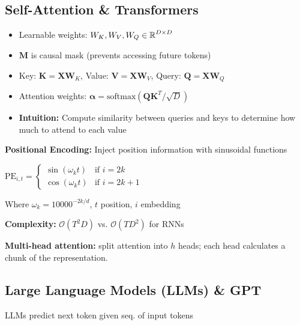 
\subsection{Self-Attention \& Transformers}


\begin{itemize}
    \item Learnable weights: $W_K, W_V, W_Q \in \operatorname{\mathbb{R}}^{D \times D}$
    \item $\mathbf{M}$ is causal mask (prevents accessing future tokens)
    \item \small Key: $\mathbf{K} = \mathbf{X}\mathbf{W}_K$, Value: $\mathbf{V} = \mathbf{X}\mathbf{W}_V$, Query: $\mathbf{Q} = \mathbf{X}\mathbf{W}_Q$
    \item Attention weights: $\boldsymbol{\alpha} = \text{softmax}(\mathbf{Q}\mathbf{K}^T / \sqrt{D})$
    \item \textbf{Intuition:} Compute similarity between queries and keys to determine how much to attend to each value
\end{itemize}

\textbf{Positional Encoding:} Inject position information with sinusoidal functions

$\text{PE}_{i,t} = \begin{cases}
\sin(\omega_k t) & \text{if } i = 2k \\
\cos(\omega_k t) & \text{if } i = 2k+1
\end{cases}$

Where $\omega_k = 10000^{-2k/d}$, $t$ position, $i$ embedding

\textbf{Complexity:} $\mathcal{O}(T^2 D)$ vs. $\mathcal{O}(TD^2)$ for RNNs

\textbf{Multi-head attention:} split attention into $h$ heads; each head calculates a chunk of the representation. 

\subsection{Large Language Models (LLMs) \& GPT}

LLMs predict next token given seq. of input tokens

